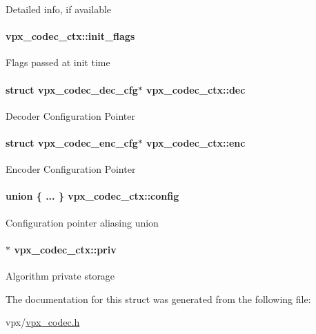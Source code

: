 \-Detailed info, if available \hypertarget{structvpx__codec__ctx_a76546548086c060a6bd21cb55037fb2b}{
\paragraph[{init\-\_\-flags}]{ {\bf vpx\-\_\-codec\-\_\-ctx\-::init\-\_\-flags}}}\label{structvpx__codec__ctx_a76546548086c060a6bd21cb55037fb2b}
\-Flags passed at init time \hypertarget{structvpx__codec__ctx_abb82988485a036fb80e36ed22ec1e984}{
\paragraph[{dec}]{\setlength{\rightskip}{0pt plus 5cm}struct {\bf vpx\-\_\-codec\-\_\-dec\-\_\-cfg}$\ast$ {\bf vpx\-\_\-codec\-\_\-ctx\-::dec}}}\label{structvpx__codec__ctx_abb82988485a036fb80e36ed22ec1e984}
\-Decoder \-Configuration \-Pointer \hypertarget{structvpx__codec__ctx_a3755f3c166d9aacd8a262a81ac18fa8f}{
\paragraph[{enc}]{\setlength{\rightskip}{0pt plus 5cm}struct {\bf vpx\-\_\-codec\-\_\-enc\-\_\-cfg}$\ast$ {\bf vpx\-\_\-codec\-\_\-ctx\-::enc}}}\label{structvpx__codec__ctx_a3755f3c166d9aacd8a262a81ac18fa8f}
\-Encoder \-Configuration \-Pointer \hypertarget{structvpx__codec__ctx_aaa15a858376e55269a0a7ba5bff09f04}{
\paragraph[{config}]{\setlength{\rightskip}{0pt plus 5cm}union \{ ... \}                          {\bf vpx\-\_\-codec\-\_\-ctx\-::config}}}\label{structvpx__codec__ctx_aaa15a858376e55269a0a7ba5bff09f04}
\-Configuration pointer aliasing union \hypertarget{structvpx__codec__ctx_acee775fd5b7580e112e245ce39733f92}{
\paragraph[{priv}]{$\ast$ {\bf vpx\-\_\-codec\-\_\-ctx\-::priv}}}\label{structvpx__codec__ctx_acee775fd5b7580e112e245ce39733f92}
\-Algorithm private storage 

\-The documentation for this struct was generated from the following file\-:\begin{DoxyCompactItemize}
\item 
vpx/\hyperlink{vpx__codec_8h}{vpx\-\_\-codec.\-h}\end{DoxyCompactItemize}
